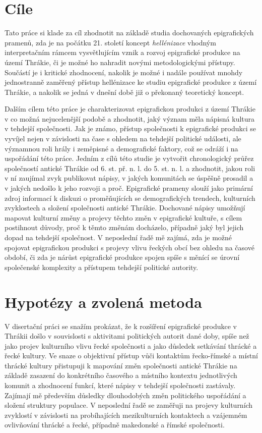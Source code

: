 \section[cíle]{Cíle}

Tato práce si klade za cíl zhodnotit na základě studia dochovaných epigrafických pramenů, zda je na počátku 21. století koncept {\em hellénizace} vhodným interpretačním rámcem vysvětlujícím vznik a rozvoj epigrafické produkce na území Thrákie, či je možné ho nahradit novými metodologickými přístupy. Součástí je i kritické zhodnocení, nakolik je možné i nadále používat mnohdy jednostranně zaměřený přístup hellénizace ke studiu epigrafické produkce z území Thrákie, a nakolik se jedná v dnešní době již o překonaný teoretický koncept.

Dalším cílem této práce je charakterizovat epigrafickou produkci z území Thrákie v co možná nejucelenější podobě a zhodnotit, jaký význam měla nápisná kultura v tehdejší společnosti. Jak je známo, přístup společnosti k epigrafické produkci se vyvíjel nejen v závislosti na čase s ohledem na tehdejší politické události, ale významnou roli hrály i zeměpisné a demografické faktory, což se odráží i na uspořádání této práce. Jedním z cílů této studie je vytvořit chronologický průřez společností antické Thrákie od 6. st. př. n. l. do 5. st. n. l. a zhodnotit, jakou roli v ní zaujímal zvyk publikovat nápisy, v jakých komunitách se úspěšně prosadil a v jakých nedošlo k jeho rozvoji a proč. Epigrafické prameny slouží jako primární zdroj informací k diskuzi o proměňujících se demografických trendech, kulturních zvyklostech a složení společnosti antické Thrákie. Dochované nápisy umožňují mapovat kulturní změny a projevy těchto změn v epigrafické kultuře, s cílem postihnout důvody, proč k těmto změnám docházelo, případně jaký byl jejich dopad na tehdejší společnost. V neposlední řadě mě zajímá, zda je možné spojovat epigrafickou produkci s projevy vlivu řeckých obcí bez ohledu na časové období, či zda je nárůst epigrafické produkce spojen spíše s měnící se úrovní společenské komplexity a přístupem tehdejší politické autority.

\section[hypotézy-a-zvolená-metoda]{Hypotézy a zvolená metoda}

V disertační práci se snažím prokázat, že k rozšíření epigrafické produkce v Thrákii došlo v souvislosti s aktivitami politických autorit dané doby, spíše než jako projev kulturního vlivu řecké společnosti a jako důsledek setkávání thrácké a řecké kultury. Ve snaze o objektivní přístup vůči kontaktům řecko-římské a místní thrácké kultury přistupuji k mapování změn společnosti antické Thrákie na základě zasazení do konkrétního časového a místního kontextu jednotlivých komunit a zhodnocení funkcí, které nápisy v tehdejší společnosti zastávaly. Zajímají mě především důsledky dlouhodobých změn politického uspořádání a složení struktury populace. V neposlední řadě se zaměřuji na projevy kulturních zvyklostí v závislosti na probíhajících mezikulturních kontaktech a vzájemném ovlivňování thrácké a řecké, případně makedonské a římské společnosti.


